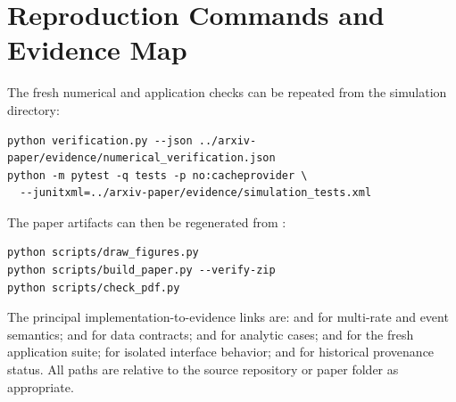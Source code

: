 \documentclass[11pt,a4paper]{article}
\begin{document}
\appendix
\section{Reproduction Commands and Evidence Map}
The fresh numerical and application checks can be repeated from the simulation directory:
\begin{lstlisting}
python verification.py --json ../arxiv-paper/evidence/numerical_verification.json
python -m pytest -q tests -p no:cacheprovider \
  --junitxml=../arxiv-paper/evidence/simulation_tests.xml
\end{lstlisting}
The paper artifacts can then be regenerated from :
\begin{lstlisting}
python scripts/draw_figures.py
python scripts/build_paper.py --verify-zip
python scripts/check_pdf.py
\end{lstlisting}

The principal implementation-to-evidence links are:  and  for multi-rate and event semantics;  and  for data contracts;  and  for analytic cases;  and  for the fresh application suite;  for isolated interface behavior; and  for historical provenance status. All paths are relative to the source repository or paper folder as appropriate.
\end{document}
